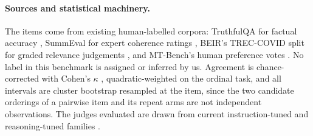 \paragraph{Sources and statistical machinery.}
The items come from existing human-labelled corpora: TruthfulQA for factual
accuracy \citep{lin2022truthfulqa}, SummEval for expert coherence ratings
\citep{fabbri2021summeval}, BEIR's TREC-COVID split for graded relevance
judgements \citep{thakur2021beir}, and MT-Bench's human preference votes
\citep{zheng2023judging}. No label in this benchmark is assigned or inferred by
us. Agreement is chance-corrected with Cohen's $\kappa$
\citep{cohen1960coefficient}, quadratic-weighted on the ordinal task, and all
intervals are cluster bootstrap \citep{efron1979bootstrap} resampled at the item,
since the two candidate orderings of a pairwise item and its repeat arms are not
independent observations. The judges evaluated are drawn from current
instruction-tuned and reasoning-tuned families \citep{openai2023gpt4,
gemini2023gemini, grattafiori2024llama3, qwen2024qwen25, jiang2023mistral,
deepseek2025r1}.
